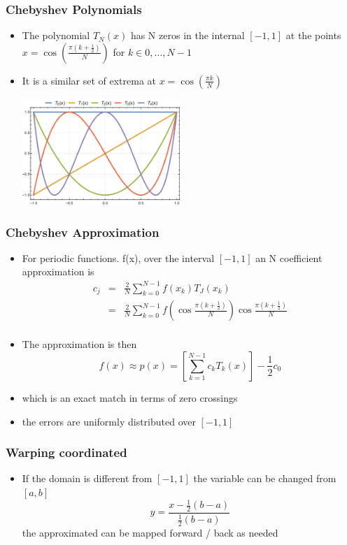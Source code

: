 \documentclass[10pt]{beamer}
\begin{document}
\begin{frame}
  \frametitle{Chebyshev Polynomials}
  \begin{itemize}
  \item The polynomial $T_N(x)$ has N zeros in the internal $[-1,1]$ at the points $x=\cos(\frac{\pi (k+\frac{1}{2})}{N})$ for $k \in 0, \ldots, N-1$
  \item It is a similar set of extrema at $x = \cos(\frac{\pi k}{N})$
    \centerline{\includegraphics[height=4cm]{Chebyshev}}
  \end{itemize}
\end{frame}

\begin{frame}
  \frametitle{Chebyshev Approximation}
  \begin{itemize}
  \item For periodic functions. f(x), over the interval $[-1,1]$ an N coefficient approximation is
    \[
      \begin{array}{rcl}
      c_j & = & \frac{2}{N} \sum_{k=0}^{N-1} f(x_k) T_J(x_k)\\
          & = & \frac{2}{N} \sum_{k=0}^{N-1} f\left( \cos \frac{\pi (k+\frac{1}{2})}{N} \right) \cos \frac{\pi (k+\frac{1}{2})}{N} \\
      \end{array}
    \]
  \item The approximation is then
    \[
      f(x) \approx p(x) = \left[ \sum_{k=1}^{N-1} c_k T_k(x) \right] - \frac{1}{2} c_0
    \]
  \item which is an exact match in terms of zero crossings
  \item the errors are uniformly distributed over $[-1,1]$     
  \end{itemize}
\end{frame}

\begin{frame}
  \frametitle{Warping coordinated}
  \begin{itemize}
  \item If the domain is different from $[-1,1]$ the variable can be changed from $[a,b]$
    \[
      y = \frac{x -\frac{1}{2} (b-a)}{\frac{1}{2}(b-a)}
    \]
    the approximated can be mapped forward / back as needed
  \end{itemize}
\end{frame}
\end{document}
